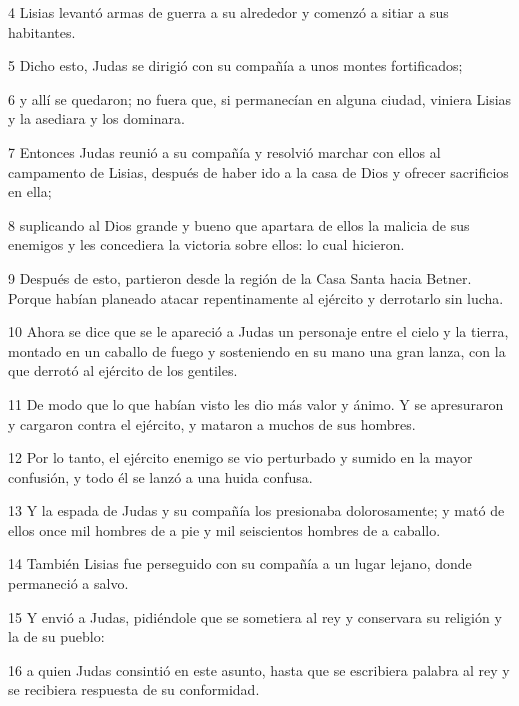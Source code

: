 \par 4 Lisias levantó armas de guerra a su alrededor y comenzó a sitiar a sus habitantes.

\par 5 Dicho esto, Judas se dirigió con su compañía a unos montes fortificados;

\par 6 y allí se quedaron; no fuera que, si permanecían en alguna ciudad, viniera Lisias y la asediara y los dominara.

\par 7 Entonces Judas reunió a su compañía y resolvió marchar con ellos al campamento de Lisias, después de haber ido a la casa de Dios y ofrecer sacrificios en ella;

\par 8 suplicando al Dios grande y bueno que apartara de ellos la malicia de sus enemigos y les concediera la victoria sobre ellos: lo cual hicieron.

\par 9 Después de esto, partieron desde la región de la Casa Santa hacia Betner. Porque habían planeado atacar repentinamente al ejército y derrotarlo sin lucha.

\par 10 Ahora se dice que se le apareció a Judas un personaje entre el cielo y la tierra, montado en un caballo de fuego y sosteniendo en su mano una gran lanza, con la que derrotó al ejército de los gentiles.

\par 11 De modo que lo que habían visto les dio más valor y ánimo. Y se apresuraron y cargaron contra el ejército, y mataron a muchos de sus hombres.

\par 12 Por lo tanto, el ejército enemigo se vio perturbado y sumido en la mayor confusión, y todo él se lanzó a una huida confusa.

\par 13 Y la espada de Judas y su compañía los presionaba dolorosamente; y mató de ellos once mil hombres de a pie y mil seiscientos hombres de a caballo.

\par 14 También Lisias fue perseguido con su compañía a un lugar lejano, donde permaneció a salvo.

\par 15 Y envió a Judas, pidiéndole que se sometiera al rey y conservara su religión y la de su pueblo:

\par 16 a quien Judas consintió en este asunto, hasta que se escribiera palabra al rey y se recibiera respuesta de su conformidad.

